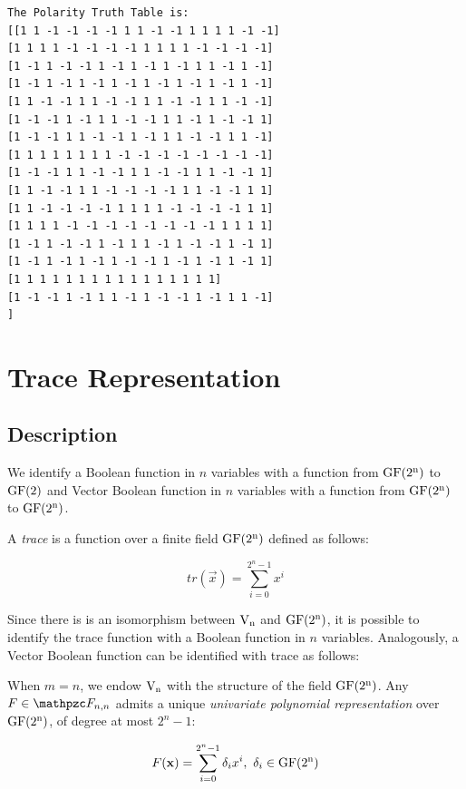 \begin{example}
\begin{verbatim}
The Polarity Truth Table is:
[[1 1 -1 -1 -1 -1 1 1 -1 -1 1 1 1 1 -1 -1]
[1 1 1 1 -1 -1 -1 -1 1 1 1 1 -1 -1 -1 -1]
[1 -1 1 -1 -1 1 -1 1 -1 1 -1 1 1 -1 1 -1]
[1 -1 1 -1 1 -1 1 -1 1 -1 1 -1 1 -1 1 -1]
[1 1 -1 -1 1 1 -1 -1 1 1 -1 -1 1 1 -1 -1]
[1 -1 -1 1 -1 1 1 -1 -1 1 1 -1 1 -1 -1 1]
[1 -1 -1 1 1 -1 -1 1 -1 1 1 -1 -1 1 1 -1]
[1 1 1 1 1 1 1 1 -1 -1 -1 -1 -1 -1 -1 -1]
[1 -1 -1 1 1 -1 -1 1 1 -1 -1 1 1 -1 -1 1]
[1 1 -1 -1 1 1 -1 -1 -1 -1 1 1 -1 -1 1 1]
[1 1 -1 -1 -1 -1 1 1 1 1 -1 -1 -1 -1 1 1]
[1 1 1 1 -1 -1 -1 -1 -1 -1 -1 -1 1 1 1 1]
[1 -1 1 -1 -1 1 -1 1 1 -1 1 -1 -1 1 -1 1]
[1 -1 1 -1 1 -1 1 -1 -1 1 -1 1 -1 1 -1 1]
[1 1 1 1 1 1 1 1 1 1 1 1 1 1 1 1]
[1 -1 -1 1 -1 1 1 -1 1 -1 -1 1 -1 1 1 -1]
]
\end{verbatim}

\end{example}

\section{Trace Representation}
\label{sec:trace}

\subsection{Description}

We identify a Boolean function in $n$ variables with a function from $\gf{GF(2^n)}$ to $\gf{GF(2)}$ and Vector Boolean function in $n$ variables with a function from $\gf{GF(2^n)}$ to $\gf{GF(2^n)}$.

A \textit{trace} is a function over a finite field $\gf{GF(2^n)}$ defined as follows:

\begin{equation}
tr(\vec{x}) = \sum_{i=0}^{2^n-1} x^i
\end{equation}

Since there is is an isomorphism between $\gf{V_n}$ and $\gf{GF(2^n)}$, it is possible to identify the trace function with a Boolean function in $n$ variables. Analogously, a Vector Boolean function can be identified with trace as follows:
 
\begin{definition}
When $m=n$, we endow $\gf{V_n}$ with the structure of the field $\gf{GF(2^n)}$. Any $F \in \funct{F}_{n,n}$ admits a unique \textit{univariate polynomial representation} over $\gf{GF(2^n)}$, of degree at most $2^n-1$: 

\begin{equation}
F(\vec{x}) = \sum_{i=0}^{2^n-1} \delta_i x^i, \ \delta_i \in \gf{GF(2^n)}
\end{equation}

\end{definition}

